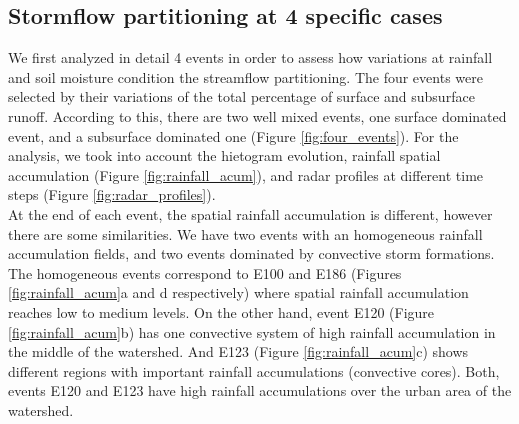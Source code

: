 \documentclass[preprint,12pt]{elsarticle}
\begin{document}
\subsection{Stormflow partitioning at 4 specific cases } \label{sec:4Cases}

We first analyzed in detail 4 events in order to assess how variations at rainfall and soil moisture condition the streamflow partitioning. The four events were selected by their variations of the total percentage of surface and subsurface runoff.  According to this, there are two well mixed events, one surface dominated event, and a subsurface dominated one (Figure \ref{fig:four_events}). For the analysis, we took into account the hietogram evolution, rainfall spatial accumulation (Figure \ref{fig:rainfall_acum}), and radar profiles at different time steps (Figure \ref{fig:radar_profiles}).\\

At the end of each event, the spatial rainfall accumulation is different, however there are some similarities. We have two events with an homogeneous rainfall accumulation fields, and two events dominated by convective storm formations. The homogeneous events correspond to  E100 and E186 (Figures \ref{fig:rainfall_acum}a and d respectively) where spatial  rainfall accumulation reaches low to medium levels. On the other hand, event E120 (Figure \ref{fig:rainfall_acum}b) has one convective system of high rainfall accumulation in the middle of the watershed.  And E123 (Figure \ref{fig:rainfall_acum}c) shows different regions with important rainfall accumulations (convective cores).  Both, events E120 and E123 have high rainfall accumulations over the urban area of the watershed.\\
\end{document}
